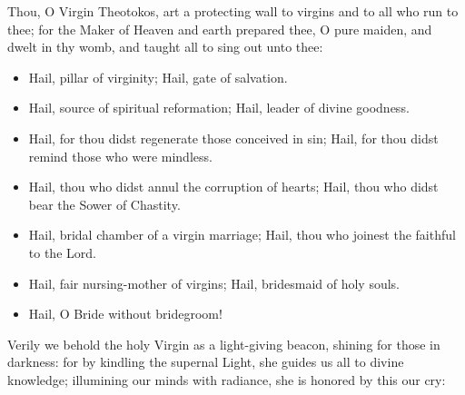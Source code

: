 \documentclass[twoside, letterpaper, 12pt]{report}
\begin{document}
\begin{priest}
  \item Thou, O Virgin Theotokos,
  art a protecting wall to virgins and to all who run to thee;
  for the Maker of Heaven and earth prepared thee, O pure maiden, and dwelt in thy
  womb, and taught all to sing out unto thee:
\end{priest}

\begin{itemize}[label=\tiny{+},leftmargin=*]
\item Hail, pillar of virginity;
      Hail, gate of salvation.
\item Hail, source of spiritual reformation;
      Hail, leader of divine goodness.
\item Hail, for thou didst regenerate those conceived in sin;
      Hail, for thou didst remind those who were mindless.
\item Hail, thou who didst annul the corruption of hearts;
      Hail, thou who didst bear the Sower of Chastity.
\item Hail, bridal chamber of a virgin marriage;
      Hail, thou who joinest the faithful to the Lord.
\item Hail, fair nursing-mother of virgins;
      Hail, bridesmaid of holy souls. 
\item Hail, O Bride without bridegroom! 
\end{itemize}





\begin{priest}
  \item Verily we behold the holy Virgin as a light-giving beacon, shining for those in
  darkness: for by kindling the supernal Light, she guides us all to divine knowledge;
  illumining our minds with radiance, she is honored by this our cry:
\end{priest}
\end{document}
